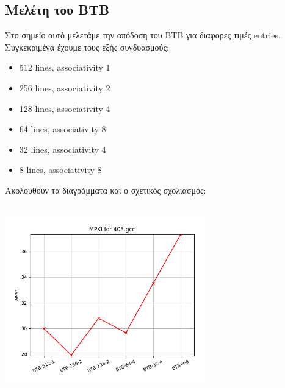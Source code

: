 \newpage
\subsection{Μελέτη του BTB}
\vspace{3mm}

Στο σημείο αυτό μελετάμε την απόδοση του BTB για διαφορες τιμές entries. 
Συγκεκριμένα έχουμε τους εξής συνδυασμούς:
\begin{itemize}
   \item 512 lines, associativity 1 
   \item 256 lines, associativity 2 
   \item 128 lines, associativity 4 
   \item 64 lines, associativity 8 
   \item 32 lines, associativity 4 
   \item 8 lines, associativity 8 
\end{itemize}

\vspace{1em}
Ακολουθούν τα διαγράμματα και ο σχετικός σχολιασμός:\vspace{1em}
\vspace{1em}    

   \begin{minipage}{\textwidth}
      \begin{center}
         \\
         \vspace{3mm}
         \includegraphics[width=0.65\textwidth, frame]{./graphs/4-3/403-gcc.png}
         \vspace{6mm}
      \end{center}
   \end{minipage}

